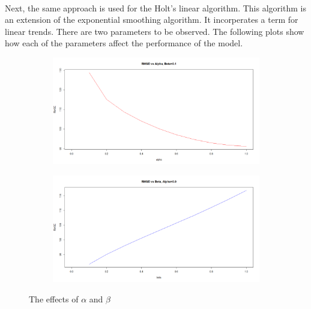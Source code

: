\documentclass[12pt]{article}
\begin{document}
\paragraph{}
Next, the same approach is used for the Holt's linear algorithm. This algorithm is an extension of the exponential smoothing algorithm. It incorperates a term for linear trends. There are two parameters to be observed. The following plots show how each of the parameters affect the performance of the model.
\begin{figure}[H]
  \centering
  \begin{subfigure}[b]{1\linewidth}
    \includegraphics[width=\linewidth]{figure20-1.png}
  \end{subfigure}
  \begin{subfigure}[b]{1\linewidth}
    \includegraphics[width=\linewidth]{figure20-2.png}
  \end{subfigure}
  \caption{The effects of $\alpha$ and $\beta$}
  \label{fig:figure21}
\end{figure}
\end{document}
